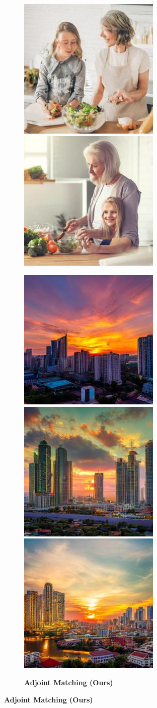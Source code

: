\documentclass[]{fairmeta}
\begin{document}
\begin{figure}[b!]
\begin{subfigure}[t]{0.495\linewidth}
        \includegraphics[width=0.32\linewidth]{figs/samples/cfg_prompt_1_image_1.jpg}\;%
        \includegraphics[width=0.32\linewidth]{figs/samples/cfg_prompt_1_image_8.jpg}
    \end{subfigure}
    \begin{subfigure}[t]{0.495\linewidth}
        \centering
        \caption*{\textbf{Adjoint Matching (Ours)}}
        \includegraphics[width=0.32\linewidth]{figs/samples/adjmat_prompt_49_image_1.jpg}\;%
        \includegraphics[width=0.32\linewidth]{figs/samples/adjmat_prompt_49_image_5.jpg}\;%
        \includegraphics[width=0.32\linewidth]{figs/samples/adjmat_prompt_49_image_7.jpg}\\

\end{subfigure}
\end{figure}
\end{document}
